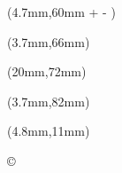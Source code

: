 \documentclass[]{article}
\begin{document}
\raggedright
\color{white}


\newlength{\originalhight}
\newlength{\originallength}
\newlength{\perfecthight}
\setlength{\perfecthight}{12.6737pt}
\newlength{\maxlength}
\setlength{\maxlength}{39mm}
\settoheight{\originalhight}{\settowidth{\originallength}{\noindent \fontsize{18.25}{18.25} \selectfont\textbf{\MakeUppercase{\playername}}}
		\ifdim \originallength > \maxlength
		\resizebox{\maxlength}{!}{\noindent \fontsize{18.25}{18.25} \selectfont\textbf{\MakeUppercase{\playername}}}
		\else
		\noindent \fontsize{18.25}{18.25} \selectfont\textbf{\MakeUppercase{\playername}}
		\fi}

\begin{textblock*}{42mm}(4.7mm,60mm + \perfecthight - \originalhight)
	\settowidth{\originallength}{\noindent \fontsize{18.25}{18.25} \selectfont\textbf{\MakeUppercase{\playername}}}
	\ifdim \originallength > \maxlength
		\resizebox{\maxlength}{!}{\noindent \fontsize{18.25}{18.25} \selectfont\textbf{\MakeUppercase{\playername}}}
	\else
		\noindent \fontsize{18.25}{18.25} \selectfont\textbf{\MakeUppercase{\playername}}
	\fi
\end{textblock*}

\begin{textblock*}{40mm}(3.7mm,66mm)
	\noindent \fontsize{9.8}{9.8} \selectfont \position
\end{textblock*}

\newlength{\maxhight}
\setlength{\maxhight}{5.9mm}
\settoheight{\originalhight}{\parbox{35mm}{
	\fontsize{7.75}{7.75} \selectfont \textit{\textbf{\motto}}}}
\begin{textblock*}{35mm}(20mm,72mm)
\ifdim \originalhight > \maxhight%
	\begin{fitbox}{35mm}{\maxhight}
		\selectfont \textit{\textbf{\motto}}
	\end{fitbox}
\else%
	\parbox{35mm}{\fontsize{7.75}{7.75} \selectfont \textit{\textbf{\motto}}}
\fi%
\end{textblock*}

\begin{textblock*}{39mm}(3.7mm,82mm)
	\noindent \fontsize{8}{8} \selectfont\textbf{\function}
\end{textblock*}

\begin{textblock*}{800mm}(4.8mm,11mm)
	\begin{turn}{-90}
	\noindent \fontsize{6}{6} \selectfont\copyright \copyrightname
	\end{turn}
\end{textblock*}
\end{document}
